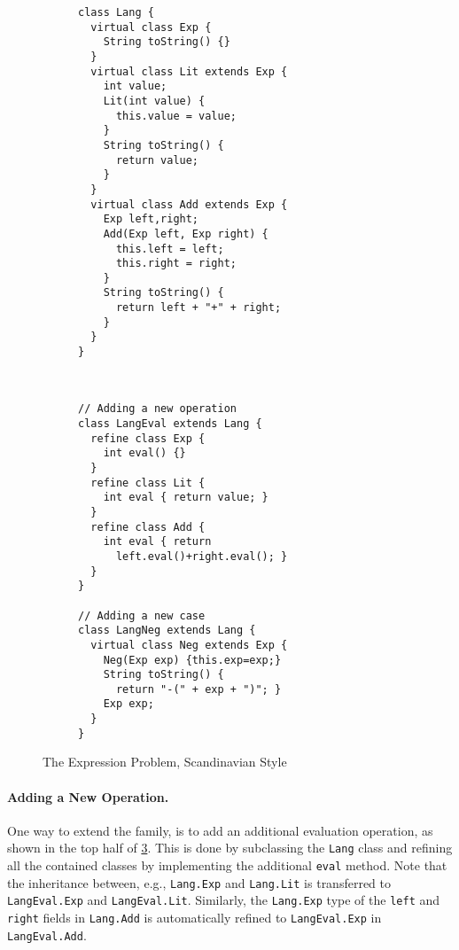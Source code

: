 \begin{figure}[t]
    \centering
    \begin{subfigure}[b]{0.5\textwidth}
\begin{lstlisting}[language=gbeta,xleftmargin=0mm]
class Lang {
  virtual class Exp {
    String toString() {}
  }
  virtual class Lit extends Exp {
    int value;
    Lit(int value) {
      this.value = value;
    }
    String toString() {
      return value;
    }
  }
  virtual class Add extends Exp {
    Exp left,right;
    Add(Exp left, Exp right) {
      this.left = left;
      this.right = right;
    }
    String toString() {
      return left + "+" + right;
    }
  }
}
\end{lstlisting}
 \label{fig:lang}
    \end{subfigure} ~
    \begin{subfigure}[b]{0.45\textwidth}
\begin{lstlisting}[language=gbeta,xleftmargin=1mm]
// Adding a new operation
class LangEval extends Lang {
  refine class Exp {
    int eval() {}
  }
  refine class Lit {
    int eval { return value; }
  }
  refine class Add {
    int eval { return
      left.eval()+right.eval(); }
  }
}

// Adding a new case
class LangNeg extends Lang {
  virtual class Neg extends Exp {
    Neg(Exp exp) {this.exp=exp;}
    String toString() {
      return "-(" + exp + ")"; }
    Exp exp;
  }
}
\end{lstlisting}
 \label{fig:extend}
    \end{subfigure}
    \caption{The Expression Problem, Scandinavian Style}
\end{figure}

\paragraph{Adding a New Operation.}
One way to extend the family, is to add an additional evaluation operation, as
shown in the top half of \cref{fig:extend}. This is done by subclassing the
\lstinline{Lang} class and refining all the contained classes by implementing
the additional \lstinline{eval} method. Note that the inheritance between, e.g.,
\lstinline{Lang.Exp} and \lstinline{Lang.Lit} is transferred to
\lstinline{LangEval.Exp} and \lstinline{LangEval.Lit}. Similarly, the
\lstinline{Lang.Exp} type of the \lstinline{left} and \lstinline{right} fields
in \lstinline{Lang.Add} is automatically refined to \lstinline{LangEval.Exp} in
\lstinline{LangEval.Add}.

